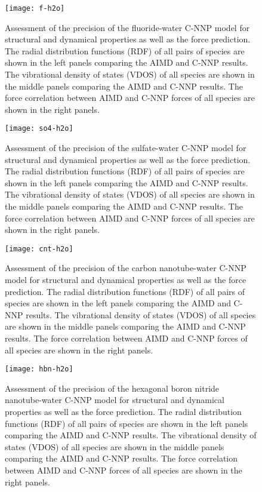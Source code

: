 \documentclass[aip,jcp,amsmath,amssymb,floatfix,reprint,citeautoscript,noeprint]{revtex4-1}
\begin{document}
\begin{bibunit}
%

\begin{figure}
\centering
\texttt{[image: f-h2o]}
\caption{\label{fig:score-f-h2o}
%
Assessment of the precision of the fluoride-water C-NNP model
for structural and dynamical properties as well as the force prediction.
%
The radial distribution functions (RDF) of all pairs of species
are shown in the left panels comparing the AIMD and C-NNP results.
%
The vibrational density of states (VDOS) of all species
are shown in the middle panels comparing the AIMD and C-NNP results.
%
The force correlation between AIMD and C-NNP forces of all species
are shown in the right panels.
%
}
\end{figure}

\begin{figure}
\centering
\texttt{[image: so4-h2o]}
\caption{\label{fig:score-so4-h2o}
%
Assessment of the precision of the sulfate-water C-NNP model
for structural and dynamical properties as well as the force prediction.
%
The radial distribution functions (RDF) of all pairs of species
are shown in the left panels comparing the AIMD and C-NNP results.
%
The vibrational density of states (VDOS) of all species
are shown in the middle panels comparing the AIMD and C-NNP results.
%
The force correlation between AIMD and C-NNP forces of all species
are shown in the right panels.
%
}
\end{figure}

\begin{figure}
\centering
\texttt{[image: cnt-h2o]}
\caption{\label{fig:score-cnt-h2o}
%
Assessment of the precision of the carbon nanotube-water C-NNP model
for structural and dynamical properties as well as the force prediction.
%
The radial distribution functions (RDF) of all pairs of species
are shown in the left panels comparing the AIMD and C-NNP results.
%
The vibrational density of states (VDOS) of all species
are shown in the middle panels comparing the AIMD and C-NNP results.
%
The force correlation between AIMD and C-NNP forces of all species
are shown in the right panels.
%
}
\end{figure}

\begin{figure}
\centering
\texttt{[image: hbn-h2o]}
\caption{\label{fig:score-hbn-h2o}
%
Assessment of the precision of the hexagonal boron nitride nanotube-water C-NNP model
for structural and dynamical properties as well as the force prediction.
%
The radial distribution functions (RDF) of all pairs of species
are shown in the left panels comparing the AIMD and C-NNP results.
%
The vibrational density of states (VDOS) of all species
are shown in the middle panels comparing the AIMD and C-NNP results.
%
The force correlation between AIMD and C-NNP forces of all species
are shown in the right panels.
%
}
\end{figure}


\end{bibunit}
\end{document}

